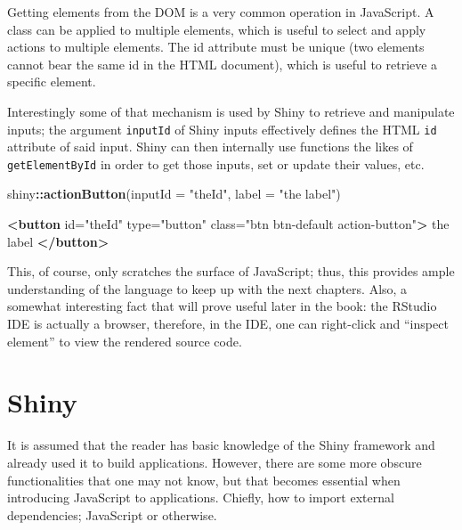 \documentclass[10pt,]{krantz}
\makeatletter
\newenvironment{Shaded}{\begin{snugshade}}{\end{snugshade}}
\newcommand{\DataTypeTok}[1]{\textcolor[rgb]{0.27,0.27,0.27}{#1}}
\newcommand{\KeywordTok}[1]{\textcolor[rgb]{0.27,0.27,0.27}{\textbf{#1}}}
\newcommand{\NormalTok}[1]{#1}
\newcommand{\OperatorTok}[1]{\textcolor[rgb]{0.43,0.43,0.43}{\textbf{#1}}}
\newcommand{\OtherTok}[1]{\textcolor[rgb]{0.37,0.37,0.37}{#1}}
\newcommand{\StringTok}[1]{\textcolor[rgb]{0.5,0.5,0.5}{#1}}
\newenvironment{kframe}{%
\medskip{}
\setlength{\fboxsep}{.8em}
 \def\at@end@of@kframe{}%
 \ifinner\ifhmode%
  \def\at@end@of@kframe{\end{minipage}}%
  \begin{minipage}{\columnwidth}%
 \fi\fi%
 \def\FrameCommand##1{\hskip\@totalleftmargin \hskip-\fboxsep
 \colorbox{shadecolor}{##1}\hskip-\fboxsep
     \hskip-\linewidth \hskip-\@totalleftmargin \hskip\columnwidth}%
 \MakeFramed {\advance\hsize-\width
   \@totalleftmargin\z@ \linewidth\hsize
   \@setminipage}}%
 {\par\unskip\endMakeFramed%
 \at@end@of@kframe}
\renewenvironment{Shaded}{\begin{kframe}}{\end{kframe}}
\makeatother
\begin{document}
Getting elements from the DOM is a very common operation in JavaScript. A class can be applied to multiple elements, which is useful to select and apply actions to multiple elements. The id attribute must be unique (two elements cannot bear the same id in the HTML document), which is useful to retrieve a specific element.

Interestingly some of that mechanism is used by Shiny to retrieve and manipulate inputs; the argument \texttt{inputId} of Shiny inputs effectively defines the HTML \texttt{id} attribute of said input. Shiny can then internally use functions the likes of \texttt{getElementById} in order to get those inputs, set or update their values, etc.

\begin{Shaded}
\begin{Highlighting}[]
\NormalTok{shiny}\OperatorTok{::}\KeywordTok{actionButton}\NormalTok{(}\DataTypeTok{inputId =} \StringTok{"theId"}\NormalTok{, }\DataTypeTok{label =} \StringTok{"the label"}\NormalTok{) }
\end{Highlighting}
\end{Shaded}

\begin{Shaded}
\begin{Highlighting}[]
\KeywordTok{<button} 
\OtherTok{  id=}\StringTok{"theId"} 
\OtherTok{  type=}\StringTok{"button"} 
\OtherTok{  class=}\StringTok{"btn btn-default action-button"}\KeywordTok{>}
\NormalTok{  the label}
\KeywordTok{</button>}
\end{Highlighting}
\end{Shaded}

This, of course, only scratches the surface of JavaScript; thus, this provides ample understanding of the language to keep up with the next chapters. Also, a somewhat interesting fact that will prove useful later in the book: the RStudio IDE is actually a browser, therefore, in the IDE, one can right-click and ``inspect element'' to view the rendered source code.

\hypertarget{basics-shiny}{%
\section{Shiny}\label{basics-shiny}}

It is assumed that the reader has basic knowledge of the Shiny framework and already used it to build applications. However, there are some more obscure functionalities that one may not know, but that becomes essential when introducing JavaScript to applications. Chiefly, how to import external dependencies; JavaScript or otherwise.
\end{document}
